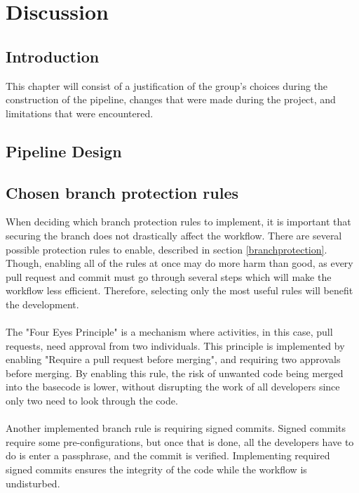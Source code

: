 \chapter{Discussion}
\section{Introduction}
This chapter will consist of a justification of the group's choices during the construction of the pipeline, changes that were made during the project, and limitations that were encountered.  

\section{Pipeline Design}

\section{Chosen branch protection rules}
When deciding which branch protection rules to implement, it is important that securing the branch does not drastically affect the workflow. There are several possible protection rules to enable, described in section \ref{branchprotection}. Though, enabling all of the rules at once may do more harm than good, as every pull request and commit must go through several steps which will make the workflow less efficient. Therefore, selecting only the most useful rules will benefit the development. 
\\~\\
The "Four Eyes Principle" is a mechanism where activities, in this case, pull requests, need approval from two individuals.  This principle is implemented by enabling "Require a pull request before merging", and requiring two approvals before merging. By enabling this rule, the risk of unwanted code being merged into the basecode is lower, without disrupting the work of all developers since only two need to look through the code. \cite{foureyes} 
\\~\\
Another implemented branch rule is requiring signed commits. Signed commits require some pre-configurations, but once that is done, all the developers have to do is enter a passphrase, and the commit is verified. Implementing required signed commits ensures the integrity of the code while the workflow is undisturbed.



